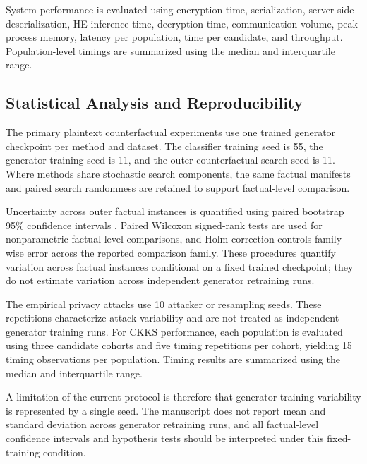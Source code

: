 \documentclass[preprint,12pt]{elsarticle}
\begin{document}
System performance is evaluated using encryption time, serialization,
server-side deserialization, HE inference time, decryption time, communication
volume, peak process memory, latency per population, time per candidate, and
throughput. Population-level timings are summarized using the median and
interquartile range.



\subsection{Statistical Analysis and Reproducibility}
\label{subsec:statistical_protocol}

The primary plaintext counterfactual experiments use one trained generator
checkpoint per method and dataset. The classifier training seed is 55, the
generator training seed is 11, and the outer counterfactual search seed is 11.
Where methods share stochastic search components, the same factual manifests
and paired search randomness are retained to support factual-level comparison.

Uncertainty across outer factual instances is quantified using paired bootstrap
95\% confidence intervals \cite{efron1979bootstrap}. Paired Wilcoxon signed-rank
tests \cite{wilcoxon1945ranking} are used for nonparametric factual-level
comparisons, and Holm correction \cite{holm1979sequential} controls
family-wise error across the reported comparison family. These procedures
quantify variation across factual instances conditional on a fixed trained
checkpoint; they do not estimate variation across independent generator
retraining runs.

The empirical privacy attacks use 10 attacker or resampling seeds. These
repetitions characterize attack variability and are not treated as independent
generator training runs. For CKKS performance, each population is evaluated
using three candidate cohorts and five timing repetitions per cohort, yielding
15 timing observations per population. Timing results are summarized using the
median and interquartile range.

A limitation of the current protocol is therefore that generator-training
variability is represented by a single seed. The manuscript does not report
mean and standard deviation across generator retraining runs, and all
factual-level confidence intervals and hypothesis tests should be interpreted
under this fixed-training condition.

\end{document}
